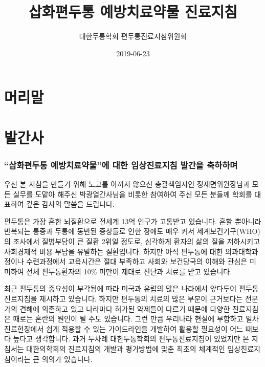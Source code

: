 \documentclass[]{book}
\title{삽화편두통 예방치료약물 진료지침}
\author{대한두통학회 편두통진료지침위원회}
\date{2019-06-23}
\begin{document}
\maketitle

{
\setcounter{tocdepth}{1}
\tableofcontents
}
\frontmatter

\hypertarget{section}{%
\chapter*{머리말}\label{section}}

\hypertarget{section-1}{%
\chapter*{발간사}\label{section-1}}

\hypertarget{section-2}{%
\subsection*{``삽화편두통 예방치료약물''에 대한 임상진료지침 발간을 축하하며}\label{section-2}}

우선 본 지침을 만들기 위해 노고를 아끼지 않으신 총괄책임자인 정재면위원장님과 모든 실무를 도맡아 해주신 박광열간사님을 비롯한 참여하여 주신 모든 분들께 학회를 대표하여 깊은 감사의 말씀을 드립니다.

편두통은 가장 흔한 뇌질환으로 전세계 13억 인구가 고통받고 있습니다. 흔할 뿐아니라 반복되는 통증과 두통에 동반된 증상들로 인한 장애도 매우 커서 세계보건기구(WHO)의 조사에서 질병부담이 큰 질환 2위일 정도로, 심각하게 환자의 삶의 질을 저하시키고 사회경제적 비용 부담을 유발하는 질환입니다. 하지만 아직 편두통에 대한 의과대학과정이나 수련과정에서 교육시간은 절대 부족하고 사회와 보건당국의 이해와 관심은 미미하여 전체 편두통환자의 10\% 미만이 제대로 진단과 치료를 받고 있습니다.

최근 편두통의 중요성이 부각됨에 따라 미국과 유럽의 많은 나라에서 앞다투어 편두통 진료지침을 제시하고 있습니다. 하지만 편두통의 치료의 많은 부분이 근거보다는 전문가의 견해에 의존하고 있고 나라마다 허가된 약제들이 다르기 때문에 다양한 진료지침은 때로는 혼란의 원인이 될 수도 있습니다. 그런 만큼 우리나라 현실에 부합하고 일차 진료현장에서 쉽게 적용할 수 있는 가이드라인을 개발하여 활용할 필요성이 어느 때보다 높다고 생각합니다. 과거 두차례 대한두통학회의 편두통진료지침이 있었지만 본 지침서는 대한의학회의 진료지침의 개발과 평가방법에 맞춘 최초의 체계적인 임상진료지침이라는 큰 의의가 있습니다.
\end{document}
